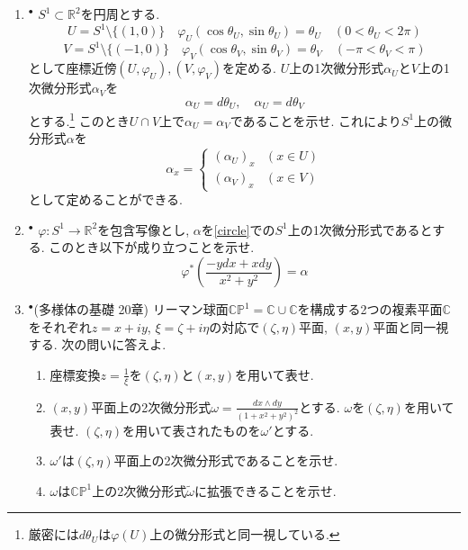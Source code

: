 \documentclass[dvipdfmx,a4paper,11pt]{article}
\newcommand{\R}{\mathbb{R}}
\newcommand{\C}{\mathbb{C}}
\theoremstyle{definition}
\begin{document}
\vspace{11pt}
\begin{enumerate}[label=\textbf{問}\ref*{sec-mfd-diff}.\arabic*]


\item \label{circle} $^{\bullet}$ $S^1 \subset \R^2$を円周とする. 
$$
U = S^1 \setminus \{(1,0)\} \quad \varphi_U(\cos\theta_U , \sin \theta_U) =\theta_U \quad (0 < \theta_U < 2\pi)
$$
$$
V= S^1 \setminus \{(-1,0)\} \quad \varphi_V(\cos\theta_V, \sin \theta_V) =\theta_V \quad (-\pi < \theta_V < \pi)
$$
として座標近傍$(U, \varphi_U), (V, \varphi_V)$を定める.
$U$上の1次微分形式$\alpha_U$と$V$上の1次微分形式$\alpha_V$を
$$
\alpha_U = d \theta_U, \quad \alpha_U = d \theta_V 
$$
とする.\footnote{厳密には$d \theta_U$は$\varphi(U)$上の微分形式と同一視している.} 
このとき$U \cap V$上で$\alpha_U = \alpha_V$であることを示せ. 
これにより$S^1$上の微分形式$\alpha$を
$$
\alpha_x = \left\{
\begin{array}{ll}
(\alpha_U)_x  & (x \in  U)\\
(\alpha_V)_x & (x \in V)
\end{array}
\right.
$$
として定めることができる. 

\item $^{\bullet}$ $\varphi: S^1 \to \R^2$を包含写像とし, $\alpha$を\ref{circle}での$S^1$上の1次微分形式であるとする. このとき以下が成り立つことを示せ. 
$$
\varphi^{*}\left( \frac{-ydx + x dy}{x^2+y^2} \right) = \alpha
$$

\item \label{complax_plane} $^{\bullet}$(多様体の基礎 20章) リーマン球面$\C\mathbb{P}^1 = \C \cup \C$を構成する2つの複素平面$\C$をそれぞれ$z = x + iy$, $\xi = \zeta + i\eta$の対応で$(\zeta, \eta)$平面, $(x,y)$平面と同一視する. 次の問いに答えよ.
\begin{enumerate}
 \setlength{\parskip}{0cm}
  \setlength{\itemsep}{2pt} 
\item 座標変換$z= \frac{1}{\xi}$を$(\zeta, \eta)$と$(x,y)$を用いて表せ.
\item $(x,y)$平面上の2次微分形式$\omega = \frac{dx \wedge dy}{(1+x^2+y^2)^2}$とする. $\omega$を$(\zeta, \eta)$を用いて表せ.  $(\zeta, \eta)$を用いて表されたものを$\omega'$とする.
\item $\omega'$は$(\zeta, \eta)$平面上の2次微分形式であることを示せ. 
\item $\omega$は$\C\mathbb{P}^1$上の2次微分形式$\widetilde{\omega}$に拡張できることを示せ.
\end{enumerate}


\end{enumerate}
\end{document}
